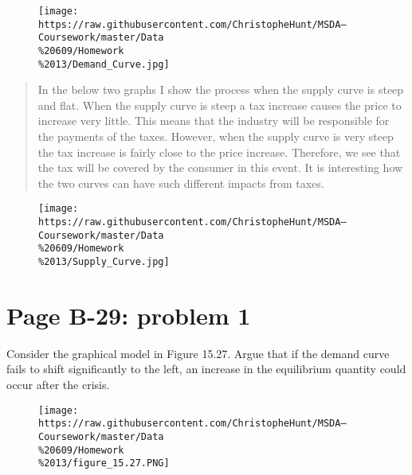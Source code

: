 \documentclass[]{article}
\begin{document}
\begin{figure}[htbp]
\centering
\texttt{[image: https://raw.githubusercontent.com/ChristopheHunt/MSDA---Coursework/master/Data\\\%20609/Homework\\\%2013/Demand\_Curve.jpg]}
\caption{}
\end{figure}

\newpage

\begin{quote}
In the below two graphs I show the process when the supply curve is
steep and flat. When the supply curve is steep a tax increase causes the
price to increase very little. This means that the industry will be
responsible for the payments of the taxes. However, when the supply
curve is very steep the tax increase is fairly close to the price
increase. Therefore, we see that the tax will be covered by the consumer
in this event. It is interesting how the two curves can have such
different impacts from taxes.
\end{quote}

\begin{figure}[htbp]
\centering
\texttt{[image: https://raw.githubusercontent.com/ChristopheHunt/MSDA---Coursework/master/Data\\\%20609/Homework\\\%2013/Supply\_Curve.jpg]}
\caption{}
\end{figure}

\newpage

\section{Page B-29: problem 1}\label{page-b-29-problem-1}

Consider the graphical model in Figure 15.27. Argue that if the demand
curve fails to shift significantly to the left, an increase in the
equilibrium quantity could occur after the crisis.

\begin{figure}[htbp]
\centering
\texttt{[image: https://raw.githubusercontent.com/ChristopheHunt/MSDA---Coursework/master/Data\\\%20609/Homework\\\%2013/figure\_15.27.PNG]}
\caption{}
\end{figure}

\begin{quote}
\end{quote}
\end{document}
